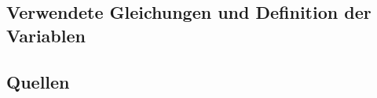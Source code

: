
\subsection{Verwendete Gleichungen und Definition der Variablen}\label{VGuD}



\subsection{Quellen}

